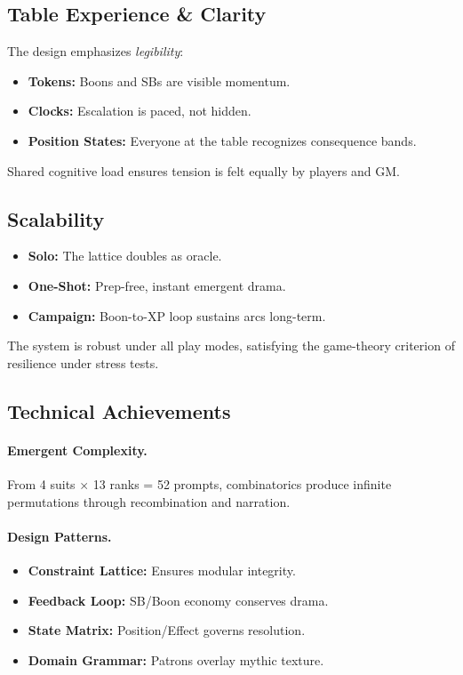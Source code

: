 \subsection{Table Experience \& Clarity}

The design emphasizes \emph{legibility}:
\begin{itemize}
  \item \textbf{Tokens:} Boons and SBs are visible momentum.
  \item \textbf{Clocks:} Escalation is paced, not hidden.
  \item \textbf{Position States:} Everyone at the table recognizes consequence bands.
\end{itemize}

Shared cognitive load ensures tension is felt equally by players and GM.

\subsection{Scalability}

\begin{itemize}
  \item \textbf{Solo:} The lattice doubles as oracle.  
  \item \textbf{One-Shot:} Prep-free, instant emergent drama.  
  \item \textbf{Campaign:} Boon-to-XP loop sustains arcs long-term.  
\end{itemize}

The system is robust under all play modes, satisfying the game-theory criterion of resilience under stress tests.

\subsection{Technical Achievements}

\paragraph{Emergent Complexity.}
From 4 suits $\times$ 13 ranks = 52 prompts, combinatorics produce infinite permutations through recombination and narration.

\paragraph{Design Patterns.}
\begin{itemize}
  \item \textbf{Constraint Lattice:} Ensures modular integrity.  
  \item \textbf{Feedback Loop:} SB/Boon economy conserves drama.  
  \item \textbf{State Matrix:} Position/Effect governs resolution.  
  \item \textbf{Domain Grammar:} Patrons overlay mythic texture.  
\end{itemize}

